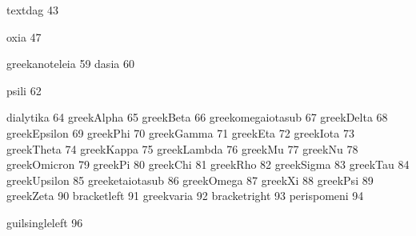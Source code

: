  textdag                            43

 oxia                               47

 greekanoteleia			            59
 dasia                              60

 psili                              62


 dialytika                          64
 greekAlpha                         65
 greekBeta                          66
 greekomegaiotasub                  67
 greekDelta                         68
 greekEpsilon                       69
 greekPhi                           70
 greekGamma                         71
 greekEta                           72
 greekIota                          73
 greekTheta                         74
 greekKappa                         75
 greekLambda                        76
 greekMu                            77
 greekNu                            78
 greekOmicron                       79
 greekPi                            80
 greekChi                           81
 greekRho                           82
 greekSigma                         83
 greekTau                           84
 greekUpsilon                       85
 greeketaiotasub                    86
 greekOmega                         87
 greekXi                            88
 greekPsi                           89
 greekZeta                          90
 bracketleft                        91
 greekvaria                         92
 bracketright                       93
 perispomeni                        94

 guilsingleleft                     96

